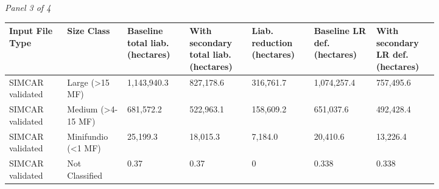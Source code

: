 \documentclass[12pt]{article}
\begin{document}
\begin{landscape}
\begin{table}[H]
\textit{Panel 3 of 4}\\[2pt]
{\fontsize{12}{14}\selectfont
\setlength{\tabcolsep}{3pt}
\renewcommand{\arraystretch}{1.08}
\begin{tabular}{p{0.117\linewidth}p{0.117\linewidth}p{0.117\linewidth}p{0.117\linewidth}p{0.117\linewidth}p{0.117\linewidth}p{0.117\linewidth}}
\toprule
Input File Type & Size Class & Baseline total liab. (hectares) & With secondary total liab. (hectares) & Liab. reduction (hectares) & Baseline LR def. (hectares) & With secondary LR def. (hectares) \\
\midrule
SIMCAR validated & Large (>15 MF) & 1,143,940.3 & 827,178.6 & 316,761.7 & 1,074,257.4 & 757,495.6 \\
SIMCAR validated & Medium (>4-15 MF) & 681,572.2 & 522,963.1 & 158,609.2 & 651,037.6 & 492,428.4 \\
SIMCAR validated & Minifundio (<1 MF) & 25,199.3 & 18,015.3 & 7,184.0 & 20,410.6 & 13,226.4 \\
SIMCAR validated & Not Classified & 0.37 & 0.37 & 0 & 0.338 & 0.338 \\
\bottomrule
\end{tabular}
}

\vspace{0.6em}


\end{table}
\end{landscape}
\end{document}

